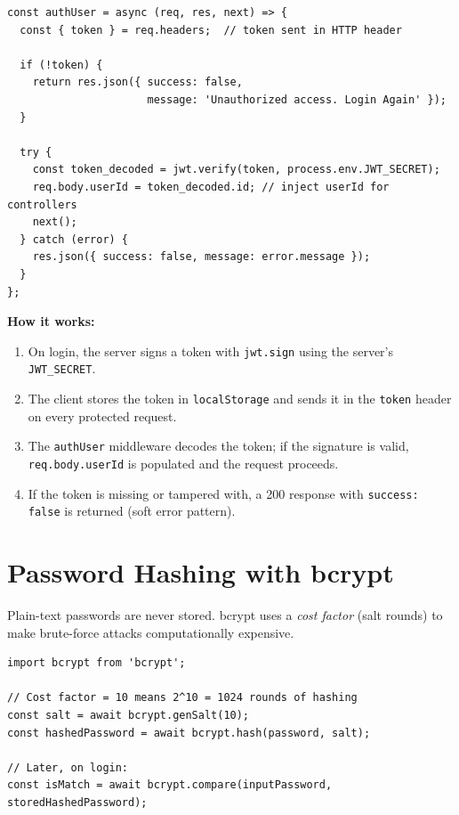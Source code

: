 \documentclass[12pt,a4paper]{report}
\begin{document}
\begin{lstlisting}[caption={Token verification middleware (auth.js)}, label=lst:auth]
const authUser = async (req, res, next) => {
  const { token } = req.headers;  // token sent in HTTP header

  if (!token) {
    return res.json({ success: false,
                      message: 'Unauthorized access. Login Again' });
  }

  try {
    const token_decoded = jwt.verify(token, process.env.JWT_SECRET);
    req.body.userId = token_decoded.id; // inject userId for controllers
    next();
  } catch (error) {
    res.json({ success: false, message: error.message });
  }
};
\end{lstlisting}

\textbf{How it works:}
\begin{enumerate}[leftmargin=*]
  \item On login, the server signs a token with \texttt{jwt.sign} using the server's
        \texttt{JWT\_SECRET}.
  \item The client stores the token in \texttt{localStorage} and sends it in the
        \texttt{token} header on every protected request.
  \item The \texttt{authUser} middleware decodes the token; if the signature is valid,
        \texttt{req.body.userId} is populated and the request proceeds.
  \item If the token is missing or tampered with, a 200 response with
        \texttt{success: false} is returned (soft error pattern).
\end{enumerate}

\section{Password Hashing with bcrypt}

Plain-text passwords are never stored.
bcrypt uses a \textit{cost factor} (salt rounds) to make brute-force attacks computationally
expensive.

\begin{lstlisting}[caption={Password hashing on registration}, label=lst:bcrypt]
import bcrypt from 'bcrypt';

// Cost factor = 10 means 2^10 = 1024 rounds of hashing
const salt = await bcrypt.genSalt(10);
const hashedPassword = await bcrypt.hash(password, salt);

// Later, on login:
const isMatch = await bcrypt.compare(inputPassword, storedHashedPassword);
\end{lstlisting}
\end{document}

